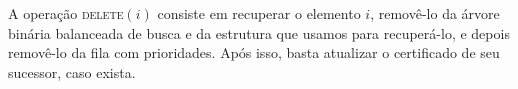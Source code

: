 



A operação \textsc{delete}$(i)$ consiste em recuperar o elemento
$i$, removê-lo da árvore binária balanceada de busca e da estrutura
que usamos para recuperá-lo, e depois removê-lo da fila com
prioridades. Após isso, basta atualizar o certificado de seu
sucessor, caso exista.


